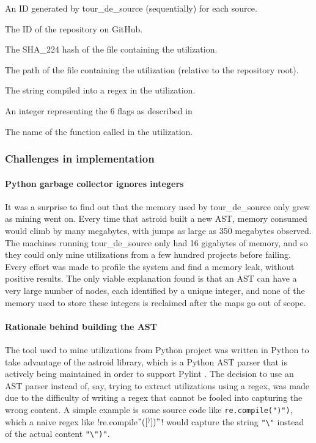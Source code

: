 \begin{description} \itemsep -1pt
\item[uniqueSourceID] An ID generated by tour\_de\_source (sequentially) for each source.
\item[repoID] The ID of the repository on GitHub.
\item[sourceJSON] 
\item[fileHash] The SHA\_224 hash of the file containing the utilization.
\item[filePath] The path of the file containing the utilization (relative to the repository root).
\item[pattern] The string compiled into a regex in the utilization.
\item[flags] An integer representing the 6 flags as described in 
\item[regexFunction] The name of the function called in the utilization.
\end{description}

\subsubsection{Challenges in implementation}
\label{sec:miningChallenges}

\paragraph{Python garbage collector ignores integers}  It was a surprise to find out that the memory used by tour\_de\_source only grew as mining went on.  Every time that astroid built a new AST, memory consumed would climb by many megabytes, with jumps as large as 350 megabytes observed.  The machines running tour\_de\_source only had 16 gigabytes of memory, and so they could only mine utilizations from a few hundred projects before failing.  Every effort was made to profile the system and find a memory leak, without positive results.  The only viable explanation found is that an AST can have a very large number of nodes, each identified by a unique integer, and none of the memory used to store these integers is reclaimed after the maps go out of scope.

\paragraph{Rationale behind building the AST} The tool used to mine utilizations from Python project was written in Python to take advantage of the astroid  library, which is a Python AST parser that is actively being maintained in order to support Pylint .  The decision to use an AST parser instead of, say, trying to extract utilizations using a regex, was made due to the difficulty of writing a regex that cannot be fooled into capturing the wrong content.  A simple example is some source code like {\tt re.compile("\")")}, which a naive regex like \cverb!re.compile\("([^)])"\)! would capture the string \verb!"\"! instead of the actual content \verb!"\")"!.

